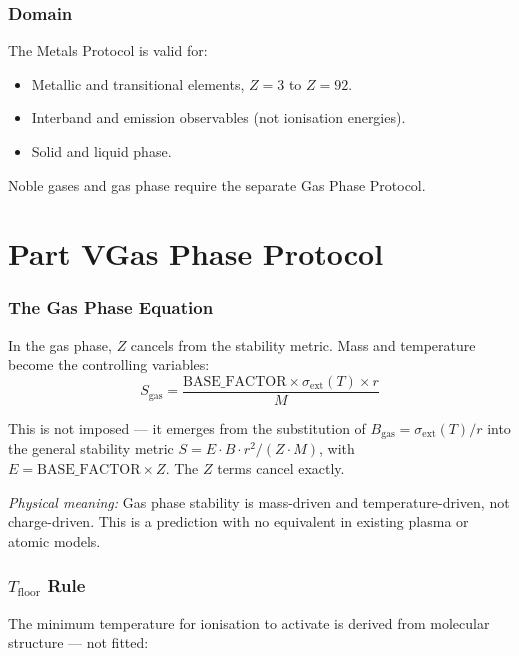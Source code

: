 \documentclass[12pt,a4paper]{article}
\theoremstyle{definition}
\begin{document}
\section{Domain}

The Metals Protocol is valid for:
\begin{itemize}[noitemsep]
  \item Metallic and transitional elements, $Z = 3$ to $Z = 92$.
  \item Interband and emission observables (not ionisation energies).
  \item Solid and liquid phase.
\end{itemize}

Noble gases and gas phase require the separate Gas Phase Protocol.

\part*{Part V\quad Gas Phase Protocol}

\section{The Gas Phase Equation}

In the gas phase, $Z$ cancels from the stability metric. Mass and temperature become the controlling variables:
\begin{equation}
  S_{\mathrm{gas}} = \frac{\mathrm{BASE\_FACTOR} \times \sigma_{\mathrm{ext}}(T) \times r}{M}
\end{equation}

This is not imposed --- it emerges from the substitution of $B_{\mathrm{gas}} = \sigma_{\mathrm{ext}}(T)/r$ into the general stability metric $S = E\cdot B\cdot r^{2}/(Z\cdot M)$, with $E = \mathrm{BASE\_FACTOR}\times Z$. The $Z$ terms cancel exactly.

\textit{Physical meaning:} Gas phase stability is mass-driven and temperature-driven, not charge-driven. This is a prediction with no equivalent in existing plasma or atomic models.

\section{$T_{\mathrm{floor}}$ Rule}

The minimum temperature for ionisation to activate is derived from molecular structure --- not fitted:
\end{document}
